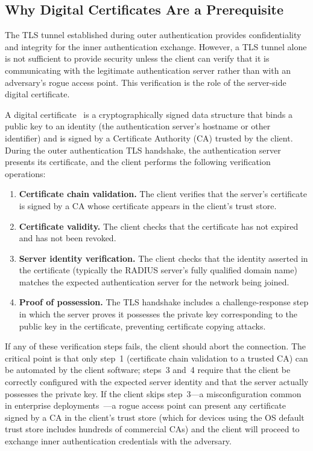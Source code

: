 \documentclass[journal]{IEEEtran}
\begin{document}
\subsection{Why Digital Certificates Are a Prerequisite}

The TLS tunnel established during outer authentication provides confidentiality and
integrity for the inner authentication exchange. However, a TLS tunnel alone is not
sufficient to provide security unless the client can verify that it is communicating
with the legitimate authentication server rather than with an adversary's rogue
access point. This verification is the role of the server-side digital certificate.

A digital certificate~\cite{rfc5280} is a cryptographically signed data structure
that binds a public key to an identity (the authentication server's hostname or
other identifier) and is signed by a Certificate Authority (CA) trusted by the
client. During the outer authentication TLS handshake, the authentication server
presents its certificate, and the client performs the following verification
operations:

\begin{enumerate}
  \item \textbf{Certificate chain validation.} The client verifies that the
        server's certificate is signed by a CA whose certificate appears in the
        client's trust store.
  \item \textbf{Certificate validity.} The client checks that the certificate has
        not expired and has not been revoked.
  \item \textbf{Server identity verification.} The client checks that the identity
        asserted in the certificate (typically the RADIUS server's fully qualified
        domain name) matches the expected authentication server for the network
        being joined.
  \item \textbf{Proof of possession.} The TLS handshake includes a challenge-response
        step in which the server proves it possesses the private key corresponding
        to the public key in the certificate, preventing certificate copying attacks.
\end{enumerate}

If any of these verification steps fails, the client should abort the connection.
The critical point is that only step~1 (certificate chain validation to a trusted CA)
can be automated by the client software; steps~3 and~4 require that the client be
correctly configured with the expected server identity and that the server actually
possesses the private key. If the client skips step~3---a misconfiguration common
in enterprise deployments~\cite{asokan2013}---a rogue access point can present any
certificate signed by a CA in the client's trust store (which for devices using the
OS default trust store includes hundreds of commercial CAs) and the client will
proceed to exchange inner authentication credentials with the adversary.
\end{document}
